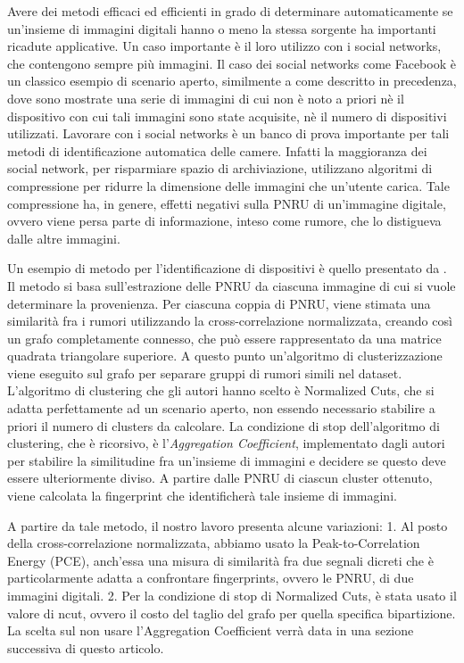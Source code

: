 Avere dei metodi efficaci ed efficienti in grado di determinare automaticamente se un'insieme di immagini digitali hanno o meno la stessa sorgente ha importanti ricadute applicative. Un caso importante è il loro utilizzo con i social networks, che contengono sempre più immagini. Il caso dei social networks come Facebook è un classico esempio di scenario aperto, similmente a come descritto in precedenza, dove sono mostrate una serie di immagini di cui non è noto a priori nè il dispositivo con cui tali immagini sono state acquisite, nè il numero di dispositivi utilizzati. Lavorare con i social networks è un banco di prova importante per tali metodi di identificazione automatica delle camere. Infatti la maggioranza dei social network, per risparmiare spazio di archiviazione, utilizzano algoritmi di compressione per ridurre la dimensione delle immagini che un'utente carica. Tale compressione ha, in genere, effetti negativi sulla PNRU di un'immagine digitale, ovvero viene persa parte di informazione, inteso come rumore, che lo distigueva dalle altre immagini.

Un esempio di metodo per l'identificazione di dispositivi è quello presentato da \cite{Amerini2014831}. Il metodo si basa sull'estrazione delle PNRU da ciascuna immagine di cui si vuole determinare la provenienza. Per ciascuna coppia di PNRU, viene stimata una similarità fra i rumori utilizzando la cross-correlazione normalizzata, creando così un grafo completamente connesso, che può essere rappresentato da una matrice quadrata triangolare superiore. A questo punto un'algoritmo di clusterizzazione viene eseguito sul grafo per separare gruppi di rumori simili nel dataset. L'algoritmo di clustering che gli autori hanno scelto è Normalized Cuts, che si adatta perfettamente ad un scenario aperto, non essendo necessario stabilire a priori il numero di clusters da calcolare. La condizione di stop dell'algoritmo di clustering, che è ricorsivo, è l'\emph{Aggregation Coefficient}, implementato dagli autori per stabilire la similitudine fra un'insieme di immagini e decidere se questo deve essere ulteriormente diviso. A partire dalle PNRU di ciascun cluster ottenuto, viene calcolata la fingerprint che identificherà tale insieme di immagini.

A partire da tale metodo, il nostro lavoro presenta alcune variazioni:
1. Al posto della cross-correlazione normalizzata, abbiamo usato la Peak-to-Correlation Energy (PCE), anch'essa una misura di similarità fra due segnali dicreti che è particolarmente adatta a confrontare fingerprints, ovvero le PNRU, di due immagini digitali.
2. Per la condizione di stop di Normalized Cuts, è stata usato il valore di ncut, ovvero il costo del taglio del grafo per quella specifica bipartizione. La scelta sul non usare l'Aggregation Coefficient verrà data in una sezione successiva di questo articolo.

